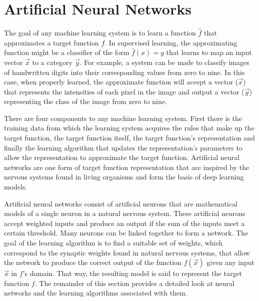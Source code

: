 \section{Artificial Neural Networks} \label{sec:background-artificial-neural-networks}

The goal of any machine learning system is to learn a function $\hat{f}$ that approximates a target function $f$. In supervised learning, the approximating function might be a classifier of the form $\hat{f}(x) = y$ that learns to map an input vector $\vec{x}$ to a category $\vec{y}$\cite{Goodfellow-et-al-2016}. For example, a system can be made to classify images of handwritten digits into their corresponding values from zero to nine. In this case, when properly learned, the approximate function will accept a vector ($\vec{x}$) that represents the intensities of each pixel in the image and output a vector ($\vec{y}$) representing the class of the image from zero to nine.

There are four components to any machine learning system. First there is the training data from which the learning system acquires the rules that make up the target function, the target function itself, the target function's representation and finally the learning algorithm that updates the representation's parameters to allow the representation to approximate the target function\cite{Mitchell}. Artificial neural networks are one form of target function representation that are inspired by the nervous systems found in living organisms and form the basis of deep learning models.

Artificial neural networks consist of artificial neurons that are mathematical models of a single neuron in a natural nervous system. These artificial neurons accept weighted inputs and produce an output if the sum of the inputs meet a certain threshold. Many neurons can be linked together to form a network. The goal of the learning algorithm is to find a suitable set of weights, which correspond to the synaptic weights found in natural nervous systems, that allow the network to produce the correct output of the function $f(\vec{x})$ given any input $\vec{x}$ in $f$'s domain. That way, the resulting model is said to represent the target function $f$. The remainder of this section provides a detailed look at neural networks and the learning algorithms associated with them.





